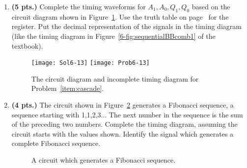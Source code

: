 \begin{enumerate}
    \item\textbf{ (5 pts.)} Complete the timing waveforms for $A_1, A_0, Q_1, Q_0$
        \label{item:cascade}
        based on the circuit diagram shown in Figure~\ref{fig:cascade}.  Use the truth
        table on page~\pageref{6-page:reg} for the register. Put the decimal
        representation of the signals in the timing diagram (like the timing
        diagram in Figure~\ref{6-fig:sequentialBBcomb1} of the textbook).\needspace{2.2in}
        \begin{figure}[ht]
            \ifshowanswers \texttt{[image: Sol6-13]}
            \else \texttt{[image: Prob6-13]} \fi
            \caption{The circuit diagram and incomplete timing diagram for
            Problem~\ref{item:cascade}.}
            \label{fig:cascade}
        \end{figure}

        \needspace{2in}
    \item\textbf{ (4 pts.)} The circuit shown in Figure~\ref{fig:fib} generates a
        Fibonacci sequence, a sequence starting with 1,1,2,3...  The next number in
        the sequence is the sum of the preceding two numbers.  Complete the
        timing diagram, assuming the circuit starts with the values shown.
        Identify the signal which generates a complete Fibonacci sequence.

        \begin{figure}[ht]
            \caption{A circuit which generates a Fibonacci sequence.}
            \label{fig:fib}
        \end{figure}

\end{enumerate}
